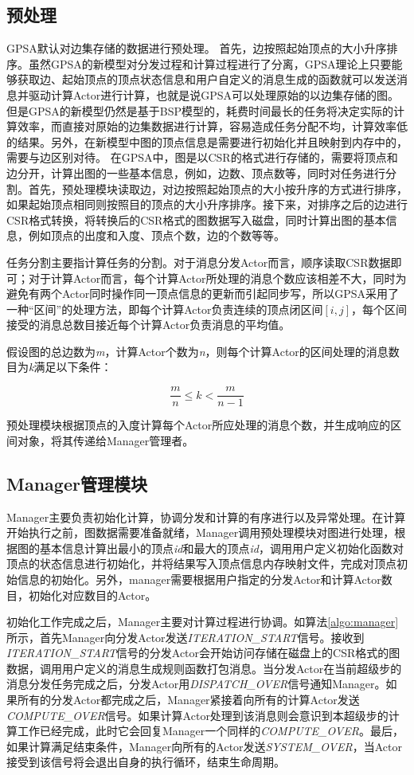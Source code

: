 \subsection{预处理}
GPSA默认对边集存储的数据进行预处理。
首先，边按照起始顶点的大小升序排序。虽然GPSA的新模型对分发过程和计算过程进行了分离，GPSA理论上只要能够获取边、起始顶点的顶点状态信息和用户自定义的消息生成的函数就可以发送消息并驱动计算Actor进行计算，也就是说GPSA可以处理原始的以边集存储的图。但是GPSA的新模型仍然是基于BSP模型的，耗费时间最长的任务将决定实际的计算效率，而直接对原始的边集数据进行计算，容易造成任务分配不均，计算效率低的结果。另外，在新模型中图的顶点信息是需要进行初始化并且映射到内存中的，需要与边区别对待。
在GPSA中，图是以CSR的格式进行存储的，需要将顶点和边分开，计算出图的一些基本信息，例如，边数、顶点数等，同时对任务进行分割。首先，预处理模块读取边，对边按照起始顶点的大小按升序的方式进行排序，如果起始顶点相同则按照目的顶点的大小升序排序。接下来，对排序之后的边进行CSR格式转换，将转换后的CSR格式的图数据写入磁盘，同时计算出图的基本信息，例如顶点的出度和入度、顶点个数，边的个数等等。

任务分割主要指计算任务的分割。对于消息分发Actor而言，顺序读取CSR数据即可；对于计算Actor而言，每个计算Actor所处理的消息个数应该相差不大，同时为避免有两个Actor同时操作同一顶点信息的更新而引起同步写，所以GPSA采用了一种“区间”的处理方法，即每个计算Actor负责连续的顶点闭区间$[i,j]$，每个区间接受的消息总数目接近每个计算Actor负责消息的平均值。

假设图的总边数为\textit{m}，计算Actor个数为\textit{n}，则每个计算Actor的区间处理的消息数目为\textit{k}满足以下条件：

\[\frac{m}{n} \le k < \frac{m}{{n - 1}}\]

预处理模块根据顶点的入度计算每个Actor所应处理的消息个数，并生成响应的区间对象，将其传递给Manager管理者。
\subsection{Manager管理模块}
Manager主要负责初始化计算，协调分发和计算的有序进行以及异常处理。在计算开始执行之前，图数据需要准备就绪，Manager调用预处理模块对图进行处理，根据图的基本信息计算出最小的顶点\textit{id}和最大的顶点\textit{id}，调用用户定义初始化函数对顶点的状态信息进行初始化，并将结果写入顶点信息内存映射文件，完成对顶点初始信息的初始化。另外，manager需要根据用户指定的分发Actor和计算Actor数目，初始化对应数目的Actor。

初始化工作完成之后，Manager主要对计算过程进行协调。如算法\ref{algo:manager}所示，首先Manager向分发Actor发送\textit{ITERATION\_START}信号。接收到\textit{ITERATION\_START}信号的分发Actor会开始访问存储在磁盘上的CSR格式的图数据，调用用户定义的消息生成规则函数打包消息。当分发Actor在当前超级步的消息分发任务完成之后，分发Actor用\textit{DISPATCH\_OVER}信号通知Manager。如果所有的分发Actor都完成之后，Manager紧接着向所有的计算Actor发送\textit{COMPUTE\_OVER}信号。如果计算Actor处理到该消息则会意识到本超级步的计算工作已经完成，此时它会回复Manager一个同样的\textit{COMPUTE\_OVER}。最后，如果计算满足结束条件，Manager向所有的Actor发送\textit{SYSTEM\_OVER}，当Actor接受到该信号将会退出自身的执行循环，结束生命周期。

